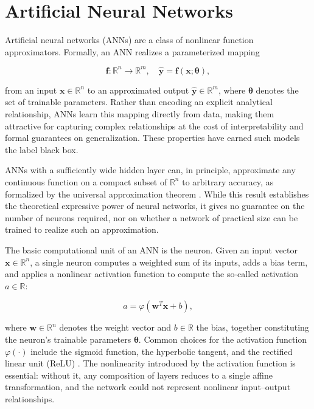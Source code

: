 \section{Artificial Neural Networks}
\label{sec:2.6ArtificialNN}

Artificial neural networks (ANNs) are a class of nonlinear function approximators. Formally, an ANN realizes a parameterized mapping

\begin{equation}
	\bm{f}: \mathbb{R}^{n} \rightarrow \mathbb{R}^{m}, \quad \hat{\bm{y}} = \bm{f}(\bm{x}; \bm{\theta}),
	\label{eq:nn_mapping}
\end{equation}

from an input $\bm{x} \in \mathbb{R}^{n}$ to an approximated output $\hat{\bm{y}} \in \mathbb{R}^{m}$, where $\bm{\theta}$ denotes the set of trainable parameters. Rather than encoding an explicit analytical relationship, ANNs learn this mapping directly from data, making them attractive for capturing complex relationships at the cost of interpretability and formal guarantees on generalization. These properties have earned such models the label black box.

ANNs with a sufficiently wide hidden layer can, in principle, approximate any continuous function on a compact subset of $\mathbb{R}^n$ to arbitrary accuracy, as formalized by the universal approximation theorem \cite{Hornik1989ApprThm}. 
While this result establishes the theoretical expressive power of neural networks, it gives no guarantee on the number of neurons required, nor on whether a network of practical size can be trained to realize such an approximation.

The basic computational unit of an ANN is the neuron. Given an input vector $\bm{x} \in \mathbb{R}^{n}$, a single neuron computes a weighted sum of its inputs, adds a bias term, and applies a nonlinear activation function to compute the so-called activation $a \in \mathbb{R}$:

\begin{equation}
	a = \varphi\left(\bm{w}^T \bm{x} + b\right),
	\label{eq:neuron}
\end{equation}

where $\bm{w} \in \mathbb{R}^{n}$ denotes the weight vector and $b \in \mathbb{R}$ the bias, together constituting the neuron's trainable parameters $\bm{\theta}$. Common choices for the activation function $\varphi(\cdot)$ include the sigmoid function, the hyperbolic tangent, and the rectified linear unit (ReLU) \cite{Goodfellow2016DeepLearning}. The nonlinearity introduced by the activation function is essential: without it, any composition of layers reduces to a single affine transformation, and the network could not represent nonlinear input–output relationships.

